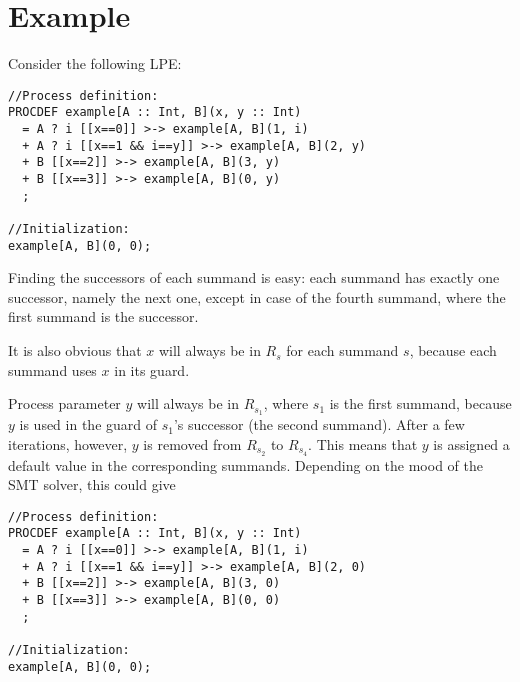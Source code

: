 \section{Example}

Consider the following LPE:

\begin{lstlisting}
//Process definition:
PROCDEF example[A :: Int, B](x, y :: Int)
  = A ? i [[x==0]] >-> example[A, B](1, i)
  + A ? i [[x==1 && i==y]] >-> example[A, B](2, y)
  + B [[x==2]] >-> example[A, B](3, y)
  + B [[x==3]] >-> example[A, B](0, y)
  ;

//Initialization:
example[A, B](0, 0);
\end{lstlisting}

Finding the successors of each summand is easy: each summand has exactly one successor, namely the next one, except in case of the fourth summand, where the first summand is the successor.

It is also obvious that $x$ will always be in $R_s$ for each summand $s$, because each summand uses $x$ in its guard.

Process parameter $y$ will always be in $R_{s_1}$, where $s_1$ is the first summand, because $y$ is used in the guard of $s_1$'s successor (the second summand).
After a few iterations, however, $y$ is removed from $R_{s_2}$ to $R_{s_4}$.
This means that $y$ is assigned a default value in the corresponding summands.
Depending on the mood of the SMT solver, this could give

\begin{lstlisting}
//Process definition:
PROCDEF example[A :: Int, B](x, y :: Int)
  = A ? i [[x==0]] >-> example[A, B](1, i)
  + A ? i [[x==1 && i==y]] >-> example[A, B](2, 0)
  + B [[x==2]] >-> example[A, B](3, 0)
  + B [[x==3]] >-> example[A, B](0, 0)
  ;

//Initialization:
example[A, B](0, 0);
\end{lstlisting}




